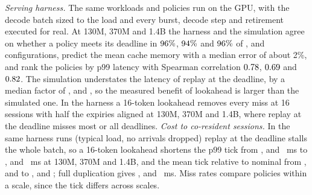 \documentclass[conference]{IEEEtran}
\begin{document}
\emph{Serving harness.} The same workloads and policies run on the GPU, with the decode batch sized to the load and every burst, decode step and retirement executed for real. At 130M, 370M and 1.4B the harness and the simulation agree on whether a policy meets its deadline in $96\%$, $94\%$ and $96\%$ of \nSvhConfigsA, \nSvhConfigsB{} and \nSvhConfigsC{} configurations, predict the mean cache memory with a median error of about 2\%, and rank the policies by p99 latency with Spearman correlation $0.78$, $0.69$ and $0.82$. The simulation understates the latency of replay at the deadline, by a median factor of \nSvhMedRatioA, \nSvhMedRatioB{} and \nSvhMedRatioC, so the measured benefit of lookahead is larger than the simulated one. In the harness a 16-token lookahead removes every miss at 16 sessions with half the expiries aligned at 130M, 370M and 1.4B, where replay at the deadline misses most or all deadlines.
\emph{Cost to co-resident sessions.} In the same harness runs (typical load, no arrivals dropped) replay at the deadline stalls the whole batch, so a 16-token lookahead
shortens the p99 tick from \nHarTickRetroA, \nHarTickRetroB{} and \nHarTickRetroC~ms to \nHarTickLaSixteenA, \nHarTickLaSixteenB{} and \nHarTickLaSixteenC~ms at 130M, 370M and 1.4B, and the mean tick relative to nominal from
\nHarSlowRetroA, \nHarSlowRetroB{} and \nHarSlowRetroC{} to \nHarSlowLaSixteenA, \nHarSlowLaSixteenB{} and \nHarSlowLaSixteenC; full duplication gives \nHarTickFullA, \nHarTickFullB{} and \nHarTickFullC~ms.
Miss rates compare policies within a scale, since the tick differs across scales.
\end{document}
